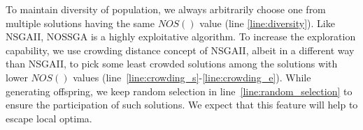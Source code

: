 To maintain diversity of population, we always arbitrarily choose one from multiple solutions having the same $NOS()$ value (line \ref{line:diversity}). Like NSGAII, NOSSGA is a highly exploitative algorithm. To increase the exploration capability, we use crowding distance concept of NSGAII, albeit in a different way than NSGAII, to pick some least crowded solutions among the solutions with lower $NOS()$ values  (line~\ref{line:crowding_s}-\ref{line:crowding_e}). While generating offspring, we keep random selection in line~\ref{line:random_selection} to ensure the participation of such solutions. We expect that this feature will help to escape local optima.



